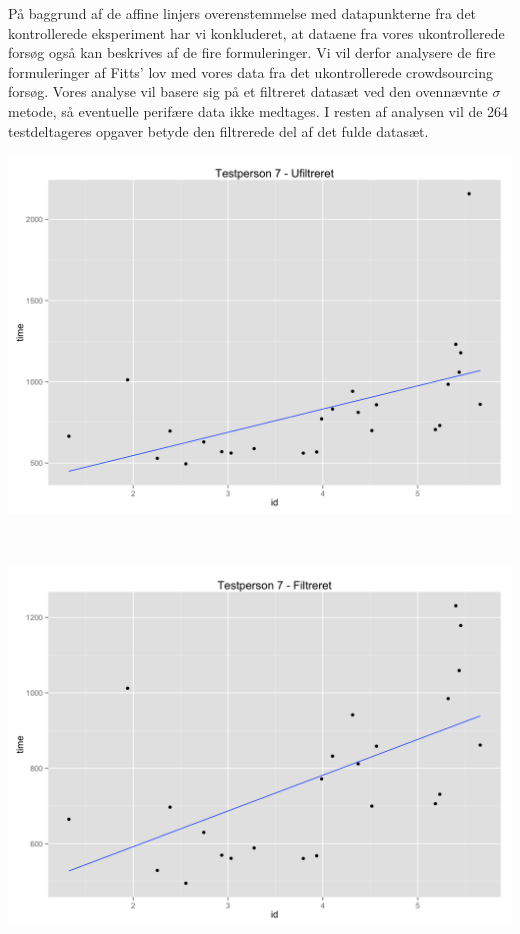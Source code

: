 \newpage
På baggrund af de affine linjers overenstemmelse med datapunkterne fra det kontrollerede eksperiment har vi konkluderet, at dataene fra vores ukontrollerede forsøg også kan beskrives af de fire formuleringer. Vi vil derfor analysere de fire formuleringer af Fitts' lov med vores data fra det ukontrollerede crowdsourcing forsøg. Vores analyse vil basere sig på et filtreret datasæt ved den ovennævnte $\sigma$ metode, så eventuelle perifære data ikke medtages. I resten af analysen vil de 264 testdeltageres opgaver betyde den filtrerede del af det fulde datasæt.

\begin{minipage}{\linewidth}
	\begin{minipage}[t]{0.45\linewidth}
		\includegraphics[width=\textwidth]{images/plots/plot_model_test_comparison_unfiltered}
		\label{fig:testdeltager7unfilter}
	\end{minipage}
	\begin{minipage}[b]{0.1\linewidth}
	~
	\end{minipage}
	\begin{minipage}[t]{.45\linewidth}
		\includegraphics[width=\textwidth]{images/plots/plot_model_test_comparison_filtered}
		\label{fig:testdeltager7filter}
	\end{minipage}
\end{minipage}

